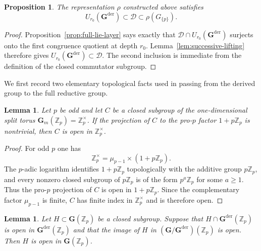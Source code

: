 \documentclass[11pt]{amsart}
\numberwithin{equation}{section}
\newcommand{\Zp}{\mathbb Z_p}
\newcommand{\GG}{\mathbf G}
\newcommand{\Gder}{\mathbf G^{\mathrm{der}}}
\newcommand{\Gm}{\mathbf G_m}
\newtheorem{proposition}[theorem]{Proposition}
\newtheorem{lemma}[theorem]{Lemma}
\theoremstyle{definition}
\begin{document}
\begin{proposition}\label{prop:large-image}
The representation $\rho$ constructed above satisfies
\[
        U_{r_0}(\Gder)
        \subset\mathcal D
        \subset\rho(G_{\{p\}}).
\]
\end{proposition}

\begin{proof}
Proposition~\ref{prop:full-lie-layer} says exactly that
$\mathcal D\cap U_{r_0}(\Gder)$ surjects onto the first congruence
quotient at depth $r_0$.  Lemma~\ref{lem:successive-lifting} therefore
gives $U_{r_0}(\Gder)\subset\mathcal D$.  The second inclusion is
immediate from the definition of the closed commutator subgroup.
\end{proof}

We first record two elementary topological facts used in passing from
the derived group to the full reductive group.

\begin{lemma}\label{lem:one-dimensional-torus-open}
Let $p$ be odd and let $C$ be a closed subgroup of the one-dimensional
split torus $\Gm(\Zp)=\Zp^\times$.  If the projection of $C$ to the
pro-$p$ factor $1+p\Zp$ is nontrivial, then $C$ is open in
$\Zp^\times$.
\end{lemma}

\begin{proof}
For odd $p$ one has
\[
        \Zp^\times=\mu_{p-1}\times(1+p\Zp).
\]
The $p$-adic logarithm identifies $1+p\Zp$ topologically with the
additive group $p\Zp$, and every nonzero closed subgroup of $p\Zp$
is of the form $p^a\Zp$ for some $a\ge1$.  Thus the pro-$p$
projection of $C$ is open in $1+p\Zp$.  Since the complementary
factor $\mu_{p-1}$ is finite, $C$ has finite index in
$\Zp^\times$ and is therefore open.
\end{proof}

\begin{lemma}\label{lem:derived-and-quotient-open}
Let $H\subset\GG(\Zp)$ be a closed subgroup.  Suppose that
$H\cap\Gder(\Zp)$ is open in $\Gder(\Zp)$ and that the image of
$H$ in $(\GG/\Gder)(\Zp)$ is open.  Then $H$ is open in
$\GG(\Zp)$.
\end{lemma}
\end{document}
